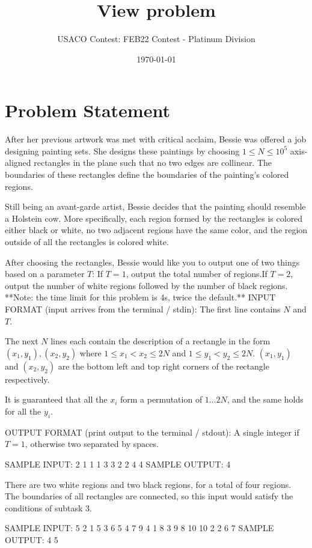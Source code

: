 \documentclass[12pt]{article}
\title{View problem}
\author{USACO Contest: FEB22 Contest - Platinum Division}
\date{\today}
\begin{document}
\maketitle

\section*{Problem Statement}

After her previous
artwork was met with critical acclaim, Bessie was offered a job designing
painting sets. She designs these paintings by choosing $1\le N\le 10^5$
axis-aligned rectangles in the plane such that no two edges are collinear. The
boundaries of these rectangles define the boundaries of the painting's colored
regions.

Still being an avant-garde artist, Bessie decides that the painting should
resemble a Holstein cow. More specifically, each region formed by the rectangles
is colored either black or white, no two adjacent regions have the same color,
and the region outside of all the rectangles is colored white.

After choosing the rectangles, Bessie would like you to output one of two things
based on a parameter $T$:
If $T=1$, output the total number of regions.If $T=2$, output the number of white regions followed by the number of black
regions.
**Note: the time limit for this problem is 4s, twice the default.**
INPUT FORMAT (input arrives from the terminal / stdin):
The first line contains $N$ and $T$.

The next $N$ lines each contain the description of a rectangle in the form
$(x_1,y_1), (x_2,y_2)$ where $1\le x_1<x_2\le 2N$ and $1\le y_1<y_2\le 2N$.
$(x_1, y_1)$ and $(x_2, y_2)$ are the bottom left and top right corners of the
rectangle respectively.

It is guaranteed that all the $x_i$ form a permutation of $1\ldots 2N$, and the
same holds for all the $y_i$.

OUTPUT FORMAT (print output to the terminal / stdout):
A single integer if $T=1$, otherwise two separated by spaces.

SAMPLE INPUT:
2 1
1 1 3 3
2 2 4 4
SAMPLE OUTPUT: 
4

There are two white regions and two black regions, for a total of four regions.
The boundaries of all rectangles are connected, so this input would satisfy the
conditions of subtask 3.


SAMPLE INPUT:
5 2
1 5 3 6
5 4 7 9
4 1 8 3
9 8 10 10
2 2 6 7
SAMPLE OUTPUT: 
4 5
\end{document}

